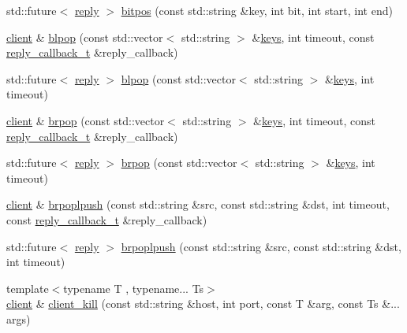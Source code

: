 \begin{DoxyCompactItemize}
\item 
std\+::future$<$ \hyperlink{classcpp__redis_1_1reply}{reply} $>$ \hyperlink{classcpp__redis_1_1client_a43b5121105276ccae731bb6093c80e02}{bitpos} (const std\+::string \&key, int bit, int start, int end)
\item 
\hyperlink{classcpp__redis_1_1client}{client} \& \hyperlink{classcpp__redis_1_1client_a432c2677b13dc8e2a9d7afe7eade39e3}{blpop} (const std\+::vector$<$ std\+::string $>$ \&\hyperlink{classcpp__redis_1_1client_acb7845a206b2321e6919c2f38282c322}{keys}, int timeout, const \hyperlink{classcpp__redis_1_1client_a061a1140d36d2eaeda82b09a0bb3f9f2}{reply\+\_\+callback\+\_\+t} \&reply\+\_\+callback)
\item 
std\+::future$<$ \hyperlink{classcpp__redis_1_1reply}{reply} $>$ \hyperlink{classcpp__redis_1_1client_ac54c987bca4efb4bf6659b063f19d5ff}{blpop} (const std\+::vector$<$ std\+::string $>$ \&\hyperlink{classcpp__redis_1_1client_acb7845a206b2321e6919c2f38282c322}{keys}, int timeout)
\item 
\hyperlink{classcpp__redis_1_1client}{client} \& \hyperlink{classcpp__redis_1_1client_adc565332168e31ebbd762f2cb12ad4d1}{brpop} (const std\+::vector$<$ std\+::string $>$ \&\hyperlink{classcpp__redis_1_1client_acb7845a206b2321e6919c2f38282c322}{keys}, int timeout, const \hyperlink{classcpp__redis_1_1client_a061a1140d36d2eaeda82b09a0bb3f9f2}{reply\+\_\+callback\+\_\+t} \&reply\+\_\+callback)
\item 
std\+::future$<$ \hyperlink{classcpp__redis_1_1reply}{reply} $>$ \hyperlink{classcpp__redis_1_1client_aa123b931c6d00027d08f0fcbde2f026e}{brpop} (const std\+::vector$<$ std\+::string $>$ \&\hyperlink{classcpp__redis_1_1client_acb7845a206b2321e6919c2f38282c322}{keys}, int timeout)
\item 
\hyperlink{classcpp__redis_1_1client}{client} \& \hyperlink{classcpp__redis_1_1client_afa7fb97bb0b30c2c78a605f48b6144e2}{brpoplpush} (const std\+::string \&src, const std\+::string \&dst, int timeout, const \hyperlink{classcpp__redis_1_1client_a061a1140d36d2eaeda82b09a0bb3f9f2}{reply\+\_\+callback\+\_\+t} \&reply\+\_\+callback)
\item 
std\+::future$<$ \hyperlink{classcpp__redis_1_1reply}{reply} $>$ \hyperlink{classcpp__redis_1_1client_aa30b9303ee0d59b07dd656db2426547e}{brpoplpush} (const std\+::string \&src, const std\+::string \&dst, int timeout)
\item 
{\footnotesize template$<$typename T , typename... Ts$>$ }\\\hyperlink{classcpp__redis_1_1client}{client} \& \hyperlink{classcpp__redis_1_1client_ae4090830d1710276c33ff5a74eba2e4b}{client\+\_\+kill} (const std\+::string \&host, int port, const T \&arg, const Ts \&... args)

\end{DoxyCompactItemize}
